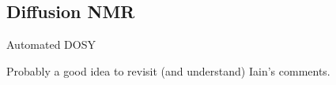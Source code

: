 \subsection{Diffusion NMR}
\label{subsec:poise__diffusion}

Automated DOSY

Probably a good idea to revisit (and understand) Iain's comments.
